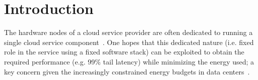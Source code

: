 \section{Introduction}



The hardware nodes of a cloud service provider are often dedicated to running a single cloud service component~\cite{FB}. 
One hopes that this dedicated nature (i.e. fixed role in the service using a fixed software stack) can be exploited to obtain the required performance (e.g. 99\% tail latency) while minimizing the energy used; a key concern given the increasingly constrained energy budgets in data centers~\cite{SmoothOperator, Dynamo, oldi}. 

